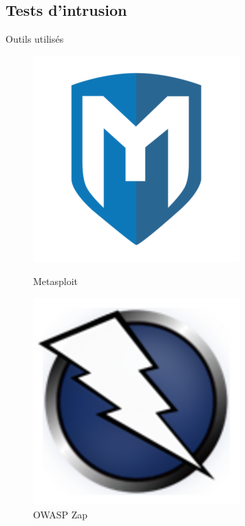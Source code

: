 \documentclass{beamer}
\begin{document}
	\subsection{Tests d'intrusion} 
		\begin{frame}{Outils utilisés}
				    \begin{figure}
        \centering
        \begin{minipage}{.5\textwidth}
            \centering
            \includegraphics[width=.4\linewidth]{schemas/images/metasploit.png}
            \caption{Metasploit}
        \end{minipage}%
        \begin{minipage}{.5\textwidth}
            \centering
            \includegraphics[width=.4\linewidth]{schemas/images/zap.png}
            \caption{OWASP Zap}
        \end{minipage}
    \end{figure}	
		\end{frame}
\end{document}
